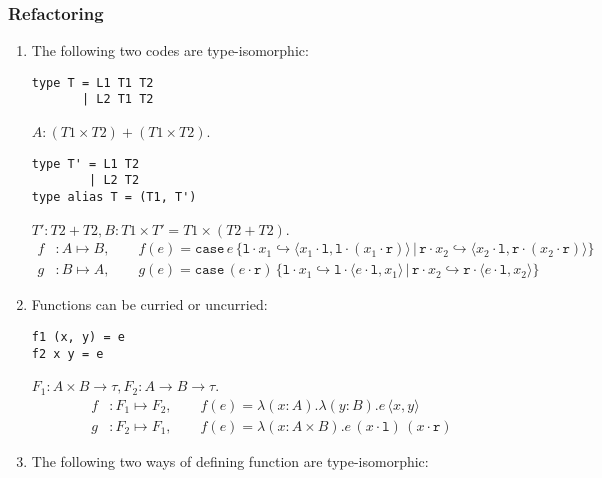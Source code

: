 \documentclass{article}
\theoremstyle{definition}
\newcommand{\ip}[1]{\langle #1 \rangle}
\newcommand{\lp}{\cdot \mathtt{l}}
\newcommand{\rp}{\cdot \mathtt{r}}
\newcommand{\li}{\mathtt{l}\cdot}
\newcommand{\ri}{\mathtt{r}\cdot}
\newcommand{\case}[5]{\mathtt{case}\, #1\, \{\li #2\hookrightarrow #3\, |\, \ri #4\hookrightarrow #5\}}
\begin{document}
\subsubsection*{Refactoring}
\begin{enumerate}
    \item The following two codes are type-isomorphic:
          \begin{mdframed}[backgroundcolor=bg]
              \begin{verbatim}
type T = L1 T1 T2
       | L2 T1 T2
        \end{verbatim}
          \end{mdframed}
          $A:(T1\times T2) +(T1\times T2)$.
          \begin{mdframed}[backgroundcolor=bg]
              \begin{verbatim}
type T' = L1 T2
        | L2 T2
type alias T = (T1, T')
            \end{verbatim}
          \end{mdframed}
          $T':T2 + T2, B: T1 \times T' = T1 \times (T2 + T2)$.
          \begin{align*}
              f & : A\mapsto B,\qquad f(e) = \case{e}{x_1}{\ip{x_1\lp, \li (x_1\rp)}}{x_2}{\ip{x_2\lp, \ri (x_2\rp)}} \\
              g & : B\mapsto A,\qquad g(e) = \case{(e\rp)}{x_1}{\li \ip{e\lp, x_1}}{x_2}{\ri \ip{e\lp, x_2}}
          \end{align*}
    \item Functions can be curried or uncurried:
          \begin{mdframed}[backgroundcolor=bg]
              \begin{verbatim}
f1 (x, y) = e
f2 x y = e
  \end{verbatim}
          \end{mdframed}
          $F_1:A\times B \rightarrow \tau, F_2: A \rightarrow B \rightarrow \tau$.
          \begin{align*}
              f & : F_1 \mapsto F_2,\qquad f(e) = \lambda (x:A).\lambda (y:B).e\, \ip{x, y}  \\
              g & : F_2 \mapsto F_1,\qquad f(e) = \lambda (x: A\times B).e\, (x\lp)\, (x\rp)
          \end{align*}
    \item The following two ways of defining function are type-isomorphic:
          \begin{mdframed}[backgroundcolor=bg]
              \begin{verbatim}

\end{verbatim}
\end{mdframed}
\end{enumerate}
\end{document}
